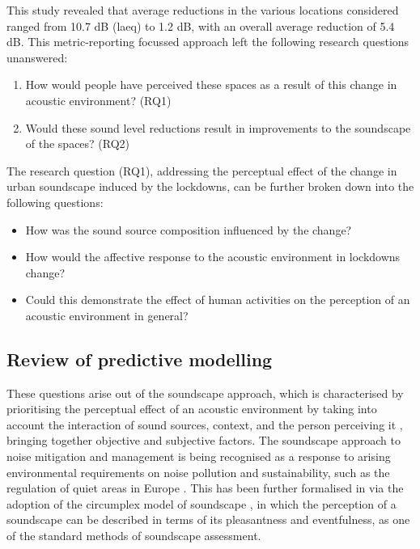  This study revealed that average reductions in the various locations considered ranged from 10.7 dB (\gls{laeq}) to 1.2 dB, with an overall average reduction of 5.4 dB. This metric-reporting focussed approach left the following research questions unanswered:
 \begin{enumerate}
   \item How would people have perceived these spaces as a result of this change in acoustic environment? (RQ1)
   \item Would these sound level reductions result in improvements to the soundscape of the spaces? (RQ2)
 \end{enumerate}

 The  research question (RQ1), addressing the perceptual effect of the change in urban soundscape induced by the lockdowns, can be further broken down into the following questions:

 \begin{itemize}
   \item How was the sound source composition influenced by the change?
   \item How would the affective response to the acoustic environment in lockdowns change?
   \item Could this demonstrate the effect of human activities on the perception of an acoustic environment in general?
 \end{itemize}


 \subsection{Review of predictive modelling}
 These questions arise out of the soundscape approach, which is characterised by prioritising the perceptual effect of an acoustic environment by taking into account the interaction of sound sources, context, and the person perceiving it \citep{ISO12913Part1,Truax1999Handbook}, bringing together objective and subjective factors. The soundscape approach to noise mitigation and management is being recognised as a response to arising environmental requirements on noise pollution and sustainability, such as the regulation of quiet areas in Europe \citep{EEA2020Environmental, Aletta2018Towards,Radicchi2021Sound}. This has been further formalised in \citet{ISO12913Part2} via the adoption of the circumplex model of soundscape \citep{Axelsson2010principal}, in which the perception of a soundscape can be described in terms of its pleasantness and eventfulness, as one of the standard methods of soundscape assessment.


